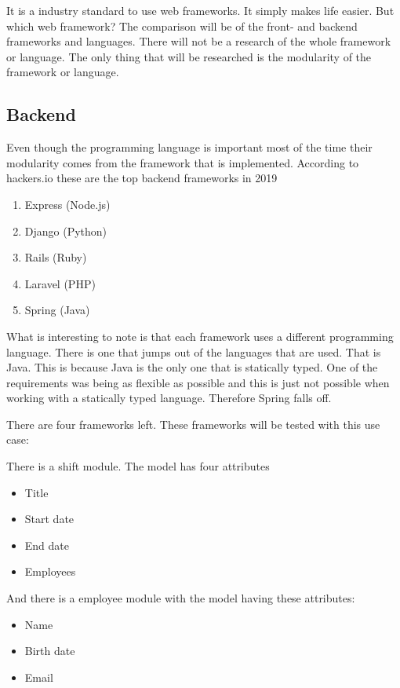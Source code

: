 It is a industry standard to use web frameworks. It simply makes life easier. But which web framework? The comparison will be of the front- and backend frameworks and languages. There will not be a research of the whole framework or language. The only thing that will be researched is the modularity of the framework or language.

\subsection{Backend}

Even though the programming language is important most of the time their modularity comes from the framework that is implemented. According to hackers.io these are the top backend frameworks in 2019 \cite{topFrameworks}

\begin{enumerate}
    \item Express (Node.js)
    \item Django (Python)
    \item Rails (Ruby)
    \item Laravel (PHP)
    \item Spring (Java)
\end{enumerate}

What is interesting to note is that each framework uses a different programming language. There is one that jumps out of the languages that are used. That is Java. This is because Java is the only one that is statically typed. One of the requirements was being as flexible as possible and this is just not possible when working with a statically typed language. Therefore Spring falls off.

There are four frameworks left. These frameworks will be tested with this use case:

There is a shift module. The model has four attributes
\begin{itemize}
    \item Title
    \item Start date
    \item End date
    \item Employees
\end{itemize}

And there is a employee module with the model having these attributes:
\begin{itemize}
    \item Name
    \item Birth date
    \item Email
\end{itemize}

